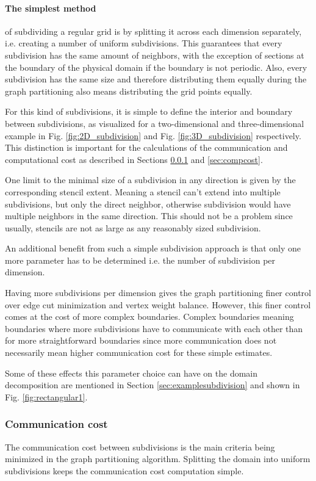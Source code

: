 \paragraph{The simplest method}of subdividing a regular grid is by splitting it across each dimension separately, i.e. creating a number of uniform subdivisions.
This guarantees that every subdivision has the same amount of neighbors, with the exception of sections at the boundary of the physical domain if the boundary is not periodic.
Also, every subdivision has the same size and therefore distributing them equally during the graph partitioning also means distributing the grid points equally.

For this kind of subdivisions, it is simple to define the interior and boundary between subdivisions, as visualized for a two-dimensional and three-dimensional example in Fig. \ref{fig:2D_subdivision} and Fig. \ref{fig:3D_subdivision} respectively.
This distinction is important for the calculations of the communication and computational cost as described in Sections \ref{sec:commcost} and \ref{sec:compcost}.

One limit to the minimal size of a subdivision in any direction is given by the corresponding stencil extent.
Meaning a stencil can't extend into multiple subdivisions, but only the direct neighbor, otherwise subdivision would have multiple neighbors in the same direction.
This should not be a problem since usually, stencils are not as large as any reasonably sized subdivision.

An additional benefit from such a simple subdivision approach is that only one more parameter has to be determined i.e. the number of subdivision per dimension.

Having more subdivisions per dimension gives the graph partitioning finer control over edge cut minimization and vertex weight balance.
However, this finer control comes at the cost of more complex boundaries.
Complex boundaries meaning boundaries where more subdivisions have to communicate with each other than for more straightforward boundaries since more communication does not necessarily mean higher communication cost for these simple estimates.

Some of these effects this parameter choice can have on the domain decomposition are mentioned in Section \ref{sec:examplesubdivision} and shown in Fig. \ref{fig:rectangular1}.

\subsubsection{Communication cost}
\label{sec:commcost}
The communication cost between subdivisions is the main criteria being minimized in the graph partitioning algorithm.
Splitting the domain into uniform subdivisions keeps the communication cost computation simple.

